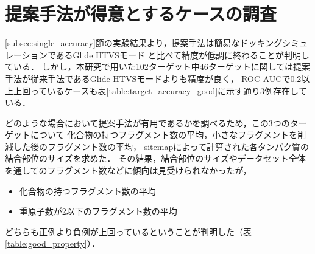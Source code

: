 \newpage

\section{提案手法が得意とするケースの調査}
\ref{subsec:single_accuracy}節の実験結果より，提案手法は簡易なドッキングシミュレーションであるGlide HTVSモード
と比べて精度が低調に終わることが判明している．
しかし，本研究で用いた102ターゲット中46ターゲットに関しては提案手法が従来手法であるGlide HTVSモードよりも精度が良く，
ROC-AUCで0.2以上上回っているケースも表\ref{table:target_accuracy_good}に示す通り3例存在している．

どのような場合において提案手法が有用であるかを調べるため，この3つのターゲットについて
化合物の持つフラグメント数の平均，小さなフラグメントを削減した後のフラグメント数の平均，
sitemap\cite{Halgren2009}によって計算された各タンパク質の結合部位のサイズを求めた．
その結果，結合部位のサイズやデータセット全体を通してのフラグメント数などに傾向は見受けられなかったが，
\begin{itemize}
\item 化合物の持つフラグメント数の平均
\item 重原子数が2以下のフラグメント数の平均
\end{itemize}
どちらも正例より負例が上回っているということが判明した（表\ref{table:good_property}）．

